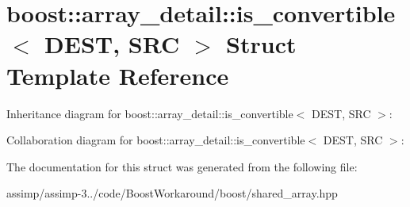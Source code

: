 \hypertarget{structboost_1_1array__detail_1_1is__convertible}{\section{boost\+:\+:array\+\_\+detail\+:\+:is\+\_\+convertible$<$ D\+E\+S\+T, S\+R\+C $>$ Struct Template Reference}
\label{structboost_1_1array__detail_1_1is__convertible}
}


Inheritance diagram for boost\+:\+:array\+\_\+detail\+:\+:is\+\_\+convertible$<$ D\+E\+S\+T, S\+R\+C $>$\+:


Collaboration diagram for boost\+:\+:array\+\_\+detail\+:\+:is\+\_\+convertible$<$ D\+E\+S\+T, S\+R\+C $>$\+:


The documentation for this struct was generated from the following file\+:\begin{DoxyCompactItemize}
\item 
assimp/assimp-\/3../code/\+Boost\+Workaround/boost/shared\+\_\+array.\+hpp\end{DoxyCompactItemize}
